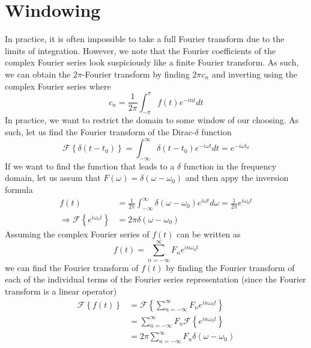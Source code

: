 \documentclass{report}
\theoremstyle{definition}
\theoremstyle{remark}
\newcommand{\ft}[1]{\mathscr{F}\left\{ #1\right\}}
\begin{document}
\section{Windowing}
In practice, it is often impossible to take a full Fourier transform due to the limits of integration. However, we note that the Fourier coefficients of the complex Fourier series look suspiciously like a finite Fourier transform. As such, we can obtain the $2\pi$-Fourier transform by finding $2\pi c_n$ and inverting using the complex Fourier series where 
\begin{equation*}
    c_n =\frac{1}{2\pi}\int^\pi_{-\pi}f(t)e^{-in t}dt
\end{equation*}
In practice, we want to restrict the domain to some window of our choosing. As such, let us find the Fourier transform of the Dirac-$\delta$ function
\begin{equation*}
    \ft{\delta (t-t_0)} = \int^\infty_{-\infty}\delta (t-t_0)e^{-i\omega t}dt = e^{-i\omega t_0}
\end{equation*}
If we want to find the function that leads to a $\delta$ function in the frequency domain, let us assum that $F(\omega)=\delta (\omega-\omega_0)$ and then appy the inversion formula 
\begin{equation*}
    \begin{split}
        f(t) &= \frac{1}{2\pi}\int^\infty_{-\infty}\delta (\omega-\omega_0)e^{i\omega t}d\omega =\frac{1}{2\pi}e^{i\omega_0 t} \\
        \Rightarrow \ft{e^{i\omega_0 t}} &= 2\pi \delta(\omega-\omega_0)
    \end{split}
\end{equation*}
Assuming the complex Fourier series of $f(t)$ can be written as 
\begin{equation*}
    f(t) = \sum^\infty_{n=-\infty} F_ne^{in\omega_0 t}
\end{equation*}
we can find the Fourier transform of $f(t)$ by finding the Fourier transform of each of the individual terms of the Fourier series representation (since the Fourier transform is a linear operator)
\begin{equation*}
    \begin{split}
        \ft{f(t)} &=\ft{\sum^\infty_{n=-\infty} F_ne^{in\omega_0 t}} \\
        &=\sum^\infty_{n=-\infty} F_n \ft{e^{in\omega_0 t}} \\
        &=2\pi\sum^\infty_{n=-\infty} F_n\delta(\omega-\omega_0)
    \end{split}
\end{equation*}
\end{document}
